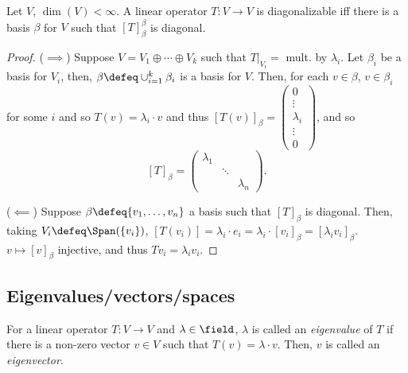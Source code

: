 \begin{proposition}\label{prop:diagonaliffbasis}
    Let $V$, $\dim(V) < \infty$. A linear operator $T : V \to V$ is diagonalizable iff there is a basis $\beta$ for $V$ such that $[T]_\beta^\beta$ is diagonal.
\end{proposition}

\begin{proof}
    ($\implies$) Suppose $V = V_1 \oplus \cdots \oplus V_k$ such that $T\vert_{V_i} = $ mult. by $\lambda_i$. Let $\beta_i$ be a basis for $V_i$, then, $\beta \defeq \cup_{i=1}^k \beta_i$ is a basis for $V$. Then, for each $v \in \beta$, $v \in \beta_i$ for some $i$ and so $T(v) = \lambda_i \cdot v$ and thus $[T(v)]_\beta = \begin{pmatrix}
        0 \\
        \vdots\\
        \lambda_i\\
        \vdots\\
        0
    \end{pmatrix}$, and so \[
    [T]_\beta = \begin{pmatrix}
        \lambda_1&  & \\
        & \ddots & \\
        & & \lambda_n
    \end{pmatrix}.
    \]

    ($\impliedby$) Suppose $\beta \defeq \{v_1, \dots, v_n\}$ a basis such that $[T]_\beta$ is diagonal. Then, taking $V_i \defeq \Span (\{v_i\})$, $[T(v_i)] = \lambda_i \cdot e_i = \lambda_i \cdot [v_i]_\beta = [\lambda_i v_i]_\beta$. $v \mapsto [v]_\beta$ injective, and thus $T v_i = \lambda_i v_i$.
\end{proof}
\subsection{Eigenvalues/vectors/spaces}
\begin{definition}
    For a linear operator $T : V \to V$ and $\lambda \in \field$, $\lambda$ is called an \emph{eigenvalue} of $T$ if there is a non-zero vector $v \in V$ such that $T(v) = \lambda \cdot v$. Then, $v$ is called an \emph{eigenvector}.
\end{definition}